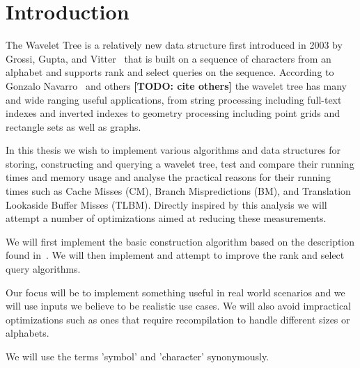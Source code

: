 \section{Introduction}
The Wavelet Tree is a relatively new data structure first introduced in 2003 by Grossi, Gupta, and Vitter~\cite{Grossi:2003:HET:644108.644250} that is built on a sequence of characters from an alphabet and supports rank and select queries on the sequence.
According to Gonzalo Navarro~\cite{Navjda13} and others \textbf{[TODO: cite others]} the wavelet tree has many and wide ranging useful applications, from string processing including full-text indexes and inverted indexes to geometry processing including point grids and rectangle sets as well as graphs.

In this thesis we wish to implement various algorithms and data structures for storing, constructing and querying a wavelet tree, test and compare their running times and memory usage and analyse the practical reasons for their running times such as Cache Misses (CM), Branch Mispredictions (BM), and Translation Lookaside Buffer Misses (TLBM). Directly inspired by this analysis we will attempt a number of optimizations aimed at reducing these measurements.

We will first implement the basic construction algorithm based on the description found in~\citep{ Navjda13}.
We will then implement and attempt to improve the rank and select query algorithms.

Our focus will be to implement something useful in real world scenarios and we will use inputs we believe to be realistic use cases.
We will also avoid impractical optimizations such as ones that require recompilation to handle different sizes or alphabets.

We will use the terms 'symbol' and 'character' synonymously.